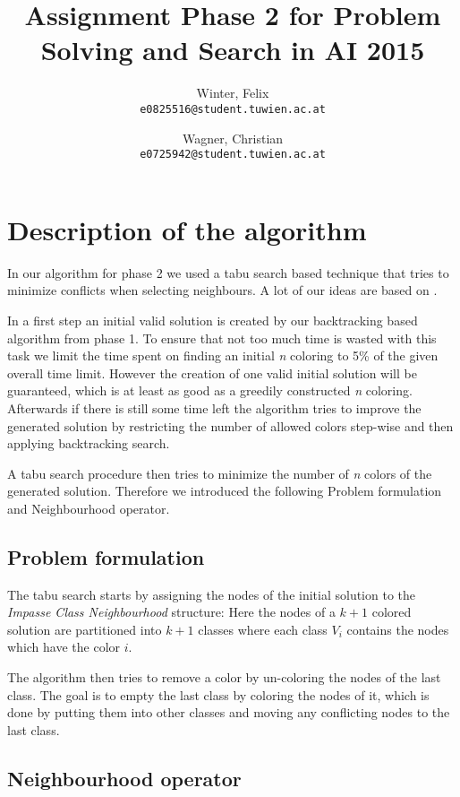 \documentclass[a4paper]{scrartcl}
\author{
  Winter, Felix\\
  \texttt{e0825516@student.tuwien.ac.at}
  \and
  Wagner, Christian\\
  \texttt{e0725942@student.tuwien.ac.at}
}
\title{Assignment Phase 2 for Problem Solving and Search in AI 2015}
\begin{document}
\setlength{\abovedisplayskip}{0pt}
\setlength{\belowdisplayskip}{0pt}

\begingroup
 \makeatletter
 \maketitle
\endgroup

\section{Description of the algorithm}

In our algorithm for phase 2 we used a tabu search based technique that tries to minimize conflicts when selecting neighbours. A lot of our ideas are based on \cite{malagutitabu}.

In a first step an initial valid solution is created by our backtracking based algorithm from phase 1. 
To ensure that not too much time is wasted with this task we limit the time spent on finding an initial \emph{n} coloring to 5\% of the given overall time limit.
However the creation of one valid initial solution will be guaranteed, which is at least as good as a greedily constructed \emph{n} coloring.
Afterwards if there is still some time left the algorithm tries to improve the generated solution by restricting the number of allowed colors step-wise and then applying backtracking search.


A tabu search procedure then tries to minimize the number of \emph{n} colors of the generated solution. Therefore we introduced the following Problem formulation and Neighbourhood operator.

\subsection{Problem formulation}

The tabu search starts by assigning the nodes of the initial solution to the \textit{Impasse Class Neighbourhood}\cite{malagutitabu} structure:
Here the nodes of a $k+1$ colored solution are partitioned into $k+1$ classes where each class $V_i$ contains the nodes which have the color $i$.

The algorithm then tries to remove a color by un-coloring the nodes of the last class. The goal is to empty the last class by coloring the nodes of it, which is done by putting them into other classes and moving any conflicting nodes to the last class. 
\subsection{Neighbourhood operator}
\end{document}
